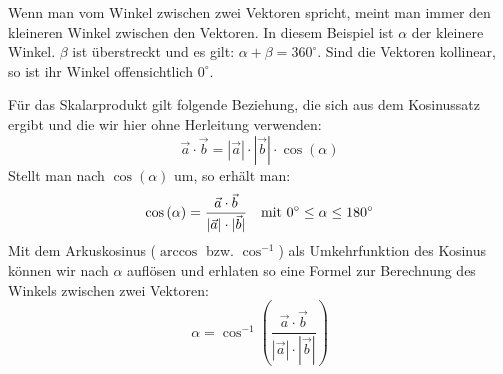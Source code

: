 \documentclass[12pt,a4paper,twoside,fleqn]{article}
\begin{document}
\begin{minipage}[b]{.65\linewidth}
  Wenn man vom Winkel zwischen zwei Vektoren spricht, meint man immer
  den  kleineren Winkel zwischen den Vektoren.
  In diesem Beispiel ist $\alpha$ der kleinere Winkel. $\beta$ ist
  überstreckt und es gilt: $\alpha + \beta = 360^\circ$.
  Sind die Vektoren kollinear, so ist ihr Winkel offensichtlich
  $0^\circ$. 
\end{minipage}
Für das Skalarprodukt gilt folgende Beziehung, die sich aus dem
Kosinussatz ergibt und die wir hier ohne Herleitung verwenden:
$$ \vec{a}\cdot\vec{b}=  |\vec{a}|\cdot|\vec{b}|\cdot \cos{(\alpha)}$$
Stellt man nach $\cos(\alpha)$ um, so erhält man:
$$\cos{(\alpha)} = \frac{\vec{a}\cdot\vec{b}}{|\vec{a}|\cdot|\vec{b}|}
\textrm{\quad mit } 0^\circ\leq \alpha\leq 180^\circ$$
Mit dem Arkuskosinus ($\arccos$ bzw. $\cos^{-1}$) als Umkehrfunktion des Kosinus
können wir nach $\alpha$ auflösen und erhlaten so eine Formel zur
Berechnung des Winkels zwischen zwei Vektoren:
$$\alpha = \cos^{-1}\left(
  \frac{\vec{a}\cdot\vec{b}}{|\vec{a}|\cdot|\vec{b}|}
   \right)$$ 
\end{document}
